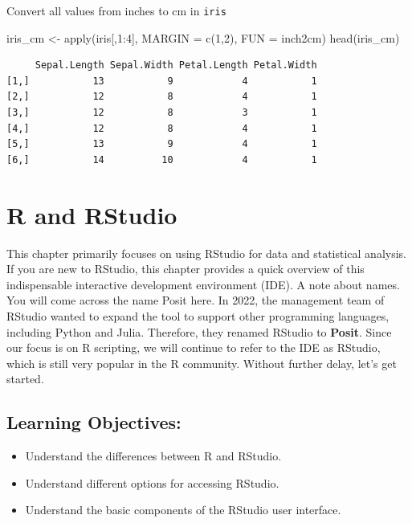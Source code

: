 \documentclass[
  letterpaper,
  DIV=11,
  numbers=noendperiod]{scrreprt}
\newenvironment{Shaded}{\begin{snugshade}}{\end{snugshade}}
\newcommand{\AttributeTok}[1]{\textcolor[rgb]{0.40,0.45,0.13}{#1}}
\newcommand{\DecValTok}[1]{\textcolor[rgb]{0.68,0.00,0.00}{#1}}
\newcommand{\FunctionTok}[1]{\textcolor[rgb]{0.28,0.35,0.67}{#1}}
\newcommand{\NormalTok}[1]{\textcolor[rgb]{0.00,0.23,0.31}{#1}}
\newcommand{\OtherTok}[1]{\textcolor[rgb]{0.00,0.23,0.31}{#1}}
\newcommand{\SpecialCharTok}[1]{\textcolor[rgb]{0.37,0.37,0.37}{#1}}
\begin{document}
Convert all values from inches to cm in \texttt{iris}

\begin{Shaded}
\begin{Highlighting}[]
\NormalTok{iris\_cm }\OtherTok{\textless{}{-}} \FunctionTok{apply}\NormalTok{(iris[,}\DecValTok{1}\SpecialCharTok{:}\DecValTok{4}\NormalTok{], }\AttributeTok{MARGIN =} \FunctionTok{c}\NormalTok{(}\DecValTok{1}\NormalTok{,}\DecValTok{2}\NormalTok{), }\AttributeTok{FUN =}\NormalTok{ inch2cm)}
\FunctionTok{head}\NormalTok{(iris\_cm)}
\end{Highlighting}
\end{Shaded}

\begin{verbatim}
     Sepal.Length Sepal.Width Petal.Length Petal.Width
[1,]           13           9            4           1
[2,]           12           8            4           1
[3,]           12           8            3           1
[4,]           12           8            4           1
[5,]           13           9            4           1
[6,]           14          10            4           1
\end{verbatim}

\chapter{R and RStudio}\label{sec-06-r-rstudio}

This chapter primarily focuses on using RStudio for data and statistical
analysis. If you are new to RStudio, this chapter provides a quick
overview of this indispensable interactive development environment
(IDE). A note about names. You will come across the name Posit here. In
2022, the management team of RStudio wanted to expand the tool to
support other programming languages, including Python and Julia.
Therefore, they renamed RStudio to \textbf{Posit}. Since our focus is on
R scripting, we will continue to refer to the IDE as RStudio, which is
still very popular in the R community. Without further delay, let's get
started.

\section*{Learning Objectives:}\label{learning-objectives-5}


\begin{itemize}
\item
  Understand the differences between R and RStudio.
\item
  Understand different options for accessing RStudio.
\item
  Understand the basic components of the RStudio user interface.
\end{itemize}
\end{document}
